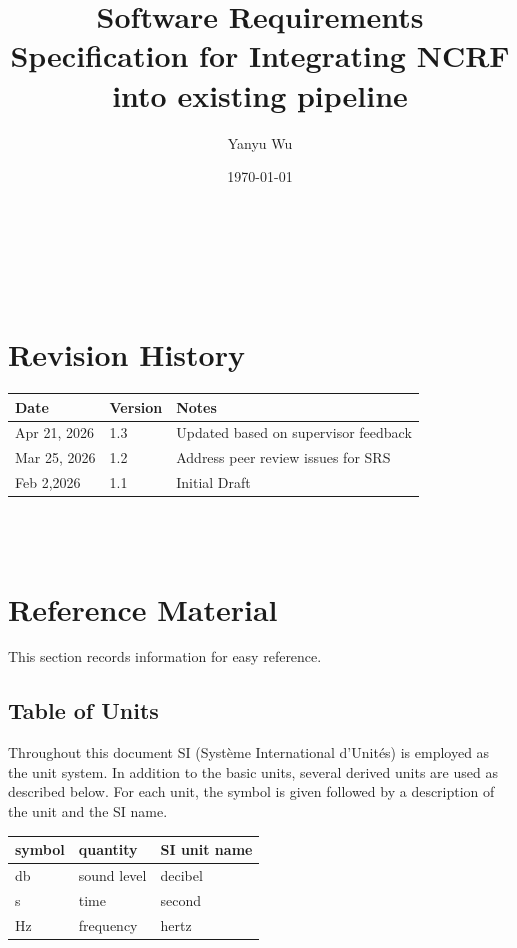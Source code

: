 \documentclass[12pt]{article}
\renewcommand{\progname}{Integrating NCRF into existing pipeline}
\begin{document}
\title{Software Requirements Specification for \progname}
\author{Yanyu Wu}
\date{\today}

\maketitle

~\newpage


\tableofcontents

~\newpage

\section*{Revision History}

\begin{tabularx}{\textwidth}{p{3cm}p{2cm}X}
  \toprule {\bf Date} & {\bf Version} & {\bf Notes}\\
  \midrule
  Apr 21, 2026 & 1.3 & Updated based on supervisor feedback\\
  Mar 25, 2026 & 1.2 & Address peer review issues for SRS\\
  Feb 2,2026 & 1.1 & Initial Draft\\
  \bottomrule
\end{tabularx}

~\\

~\newpage

\section{Reference Material}

This section records information for easy reference.

\subsection{Table of Units}

Throughout this document SI (Syst\`{e}me International d'Unit\'{e}s) is employed
as the unit system.  In addition to the basic units, several derived units are
used as described below.  For each unit, the symbol is given followed by a
description of the unit and the SI name.
~\newline

\renewcommand{\arraystretch}{1.2}
\noindent
\begin{tabular}{l l l}
  \toprule
  \textbf{symbol} & \textbf{quantity} & \textbf{SI unit name}\\
  \midrule
  \si{\decibel} & sound level & decibel\\
  \si{\second} & time & second\\
  \si{\hertz} & frequency & hertz \\
  \bottomrule
\end{tabular}
\end{document}
